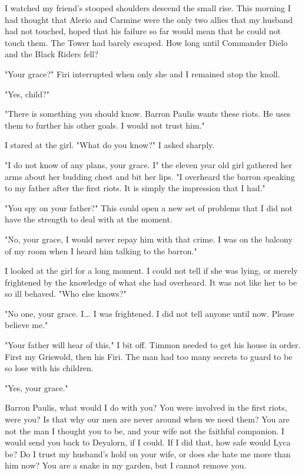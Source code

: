 \documentclass{article}
\begin{document}
I watched my friend's stooped shoulders descend the small rise. This morning I had thought that Alerio and Carmine were the only two allies that my husband had not touched, hoped that his failure so far would mean that he could not touch them. The Tower had barely escaped. How long until Commander Dielo and the Black Riders fell?

"Your grace?" Firi interrupted when only she and I remained atop the knoll.

"Yes, child?"

"There is something you should know. Barron Paulis wants these riots. He uses them to further his other goals. I would not trust him."

I stared at the girl. "What do you know?" I asked sharply.

"I do not know of any plans, your grace. I" the eleven year old girl gathered her arms about her budding chest and bit her lips. "I overheard the barron speaking to my father after the first riots. It is simply the impression that I had."

"You spy on your father?" This could open a new set of problems that I did not have the strength to deal with at the moment.

"No, your grace, I would never repay him with that crime. I was on the balcony of my room when I heard him talking to the barron."

I looked at the girl for a long moment. I could not tell if she was lying, or merely frightened by the knowledge of what she had overheard. It was not like her to be so ill behaved. "Who else knows?"

"No one, your grace. I... I was frightened. I did not tell anyone until now. Please believe me."

"Your father will hear of this," I bit off. Timmon needed to get his house in order. First my Griswold, then his Firi. The man had too many secrets to guard to be so lose with his children.

"Yes, your grace." 

Barron Paulis, what would I do with you? You were involved in the first riots, were you? Is that why our men are never around when we need them? You are not the man I thought you to be, and your wife not the faithful companion. I would send you back to Deyalorn, if I could. If I did that, how safe would Lyca be? Do I trust my husband's hold on your wife, or does she hate me more than him now? You are a snake in my garden, but I cannot remove you.
\end{document}
